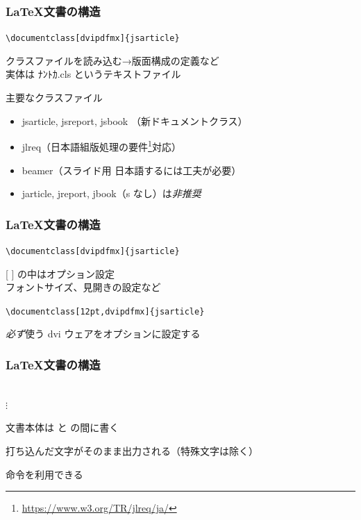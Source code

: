 \begin{frame}[fragile]
	\frametitle{\LaTeX 文書の構造}
	\begin{center}
		\verb+\documentclass[dvipdfmx]{jsarticle}+
	\end{center}

	クラスファイルを読み込む→版面構成の定義など\\
	{\footnotesize 実体は ﾅﾝﾄｶ.cls というテキストファイル}

	\begin{block}{主要なクラスファイル}
		\begin{itemize}
			\footnotesize
			\item jsarticle, jsreport, jsbook （新ドキュメントクラス）\\
			\item jlreq（日本語組版処理の要件\footnote{\url{https://www.w3.org/TR/jlreq/ja/}}対応）\\
			\item beamer（スライド用 日本語するには工夫が必要）
			\item jarticle, jreport, jbook（s なし）は\emph{非推奨}
		\end{itemize}
	\end{block}
\end{frame}

\begin{frame}[fragile]
	\frametitle{\LaTeX 文書の構造}
	\begin{center}
		\verb+\documentclass[dvipdfmx]{jsarticle}+
	\end{center}

	[ ] の中はオプション設定\\
	\bgroup\footnotesize フォントサイズ、見開きの設定など
	\begin{center}
		\verb+\documentclass[12pt,dvipdfmx]{jsarticle}+
	\end{center}
	\egroup

	\emph{必ず}使う dvi ウェアをオプションに設定する
\end{frame}

\begin{frame}[fragile]
	\frametitle{\LaTeX 文書の構造}
	\begin{center}
		\verb++\\
		$\vdots$\\
		\verb++
	\end{center}
	
	文書本体は \verb++ と \verb++ の間に書く

	打ち込んだ文字がそのまま出力される（特殊文字は除く）

	命令を利用できる
\end{frame}

